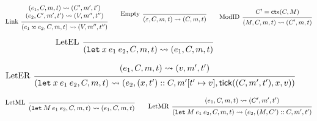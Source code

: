 \documentclass[acmsmall,review]{acmart}\settopmatter{printfolios=true,printccs=false,printacmref=false}
\theoremstyle{definition}
\newcommand*{\cons}{::}
\newcommand*{\mem}{m}
\newcommand*{\semlink}{\mathbin{\rotatebox[origin=c]{180}{$\propto$}}}
\newcommand*{\link}[2]{{#1}\semlink{#2}}
\newcommand*{\tick}{\mathsf{tick}}
\newcommand*{\modctx}{\mathsf{ctx}}
\begin{document}
\begin{figure}[h!]
  \[
    \begin{prooftree}
      \hypo{
        \begin{matrix}
          (e_{1}, C, \mem, t)
          \rightsquigarrow
          (C', \mem', t') \\
          (e_{2}, C', \mem', t')
          \rightsquigarrow
          (V, \mem'', t'')
        \end{matrix}
      }
      \infer[left label=Link]1{
      (\link{e_{1}}{e_{2}}, C, \mem, t)
      \rightsquigarrow
      (V, \mem'', t'')
      }
    \end{prooftree}\qquad
    \begin{prooftree}
      \infer[left label=Empty]0{
      (\varepsilon, C, \mem, t)
      \rightsquigarrow
      (C, \mem, t)
      }
    \end{prooftree}\qquad
    \begin{prooftree}
      \hypo{C'=\modctx(C,M)}
      \infer[left label=ModID]1{
      (M, C, \mem, t)
      \rightsquigarrow
      (C', \mem, t)
      }
    \end{prooftree}
  \]

  \[
    \begin{prooftree}
      \infer[left label=LetEL]0{
      (\mathtt{let}\:x\:e_1\:e_2, C, \mem, t)
      \rightsquigarrow
      (e_{1}, C, \mem, t)
      }
    \end{prooftree}
  \]

  \[
    \begin{prooftree}
      \hypo{
        \begin{matrix}
          (e_{1}, C, \mem, t)
          \rightsquigarrow
          (v, \mem', t')
        \end{matrix}
      }
      \infer[left label=LetER]1{
      (\mathtt{let}\:x\:e_1\:e_2, C, \mem, t)
      \rightsquigarrow
      (e_{2}, (x, t')\cons C, \mem'[t'\mapsto v], \tick((C,\mem',t'),x,v))
      }
    \end{prooftree}
  \]

  \[
    \begin{prooftree}
      \infer[left label=LetML]0{
      (\mathtt{let}\:M\:e_{1}\:e_{2}, C, \mem, t)
      \rightsquigarrow
      (e_{1}, C, \mem, t)
      }
    \end{prooftree}\qquad
    \begin{prooftree}
      \hypo{
        \begin{matrix}
          (e_{1}, C, \mem, t)
          \rightsquigarrow
          (C', \mem', t')
        \end{matrix}
      }
      \infer[left label=LetMR]1{
      (\mathtt{let}\:M\:e_{1}\:e_{2}, C, \mem, t)
      \rightsquigarrow
      (e_{2}, (M, C')\cons C, \mem', t')
      }
    \end{prooftree}
  \]


\end{figure}
\end{document}
